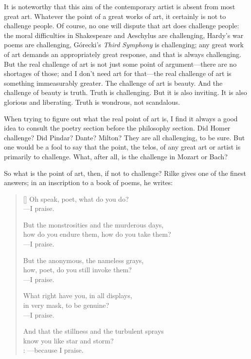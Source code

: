 \documentclass[letterpaper]{article}
\begin{document}
It is noteworthy that this aim of the contemporary artist is absent
from most great art. Whatever the point of a great works of art, it
certainly is not to challenge people. Of course, no one will dispute
that art does challenge people: the moral difficulties in Shakespeare
and Aeschylus are challenging, Hardy's war poems are challenging,
Górecki's \emph{Third Symphony} is challenging; any great work of art
demands an appropriately great response, and that is always
challenging. But the real challenge of art is not just some point of
argument---there are no shortages of those; and I don't need art for
that---the real challenge of art is something immeasurably
greater. The challenge of art is beauty. And the challenge of beauty
is truth. Truth is challenging. But it is also inviting. It is also
glorious and liberating. Truth is wondrous, not scandalous.

When trying to figure out what the real point of art is, I find it
always a good idea to consult the poetry section before the philosophy
section. Did Homer challenge? Did Pindar? Dante? Milton? They are all
challenging, to be sure. But one would be a fool to say that the
point, the telos, of any great art or artist is primarily to
challenge. What, after all, is the challenge in Mozart or Bach?

So what is the point of art, then, if not to challenge? Rilke gives
one of the finest answers; in an inscription to a book of poems, he
writes:

\begin{minipage}{\linewidth}
\settowidth{\versewidth}{Oh speak, poet, what do you do?}
\setlength{\vgap}{11em}
\begin{verse}[\versewidth]
Oh speak, poet, what do you do? \\
\vin                    ---I praise.

But the monstrosities and the murderous days, \\
how do you endure them, how do you take them? \\
\vin                    ---I praise.

But the anonymous, the nameless grays, \\
how, poet, do you still invoke them? \\
\vin                    ---I praise.

What right have you, in all displays, \\
in very mask, to be genuine? \\
\vin                    ---I praise.

And that the stillness and the turbulent sprays \\
know you like star and storm? \\
\vin                     : ---because I praise.
\end{verse}
\end{minipage}
\end{document}
